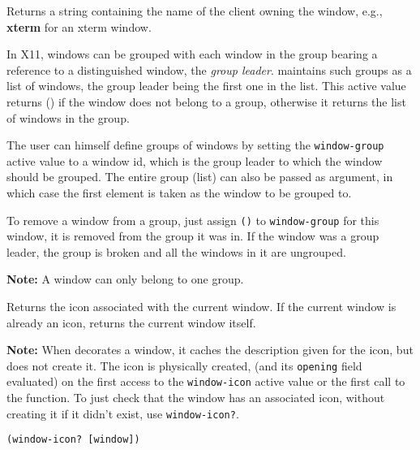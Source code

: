 
Returns a string containing the name of the client owning the window, e.g.,
{\bf xterm} for an xterm window.

        

In X11, windows can be grouped with each window in the group bearing a
reference to a distinguished window, the {\em group leader}. {\GWM}
maintains such groups as a list of windows, the group leader being the first
one in the list. This active value returns () if the window does not belong
to a group, otherwise it returns 
the list of windows in the group.

The user can himself define groups of windows by setting the
\verb"window-group" active value to a window id, which is the group leader
to which the window should be grouped. The entire group (list) can also be
passed as argument, in which case the first element is taken as
the window to be grouped to.

To remove a window from a group, just assign \verb"()" to
\verb"window-group" for this window, it is removed from the group it
was in. If the window was a group leader, the group is broken and all
the windows in it are ungrouped.

{\bf Note:}  A window can only belong to one group.

        

Returns the icon associated with the current window. If the current window
is already an icon, returns the current window itself.

{\bf Note:} When {\GWM} decorates a window, it caches the {\WOOL}
description given for the icon, but does not create it. The icon is
physically created, (and its \verb"opening" field evaluated) on the first
access to the \verb"window-icon" active value or the first call to the
 function. To just check that the window has an associated
icon, without creating it if it didn't exist, use \verb|window-icon?|.


{\usagefont\begin{verbatim}
(window-icon? [window])
\end{verbatim}}\usageupspace

